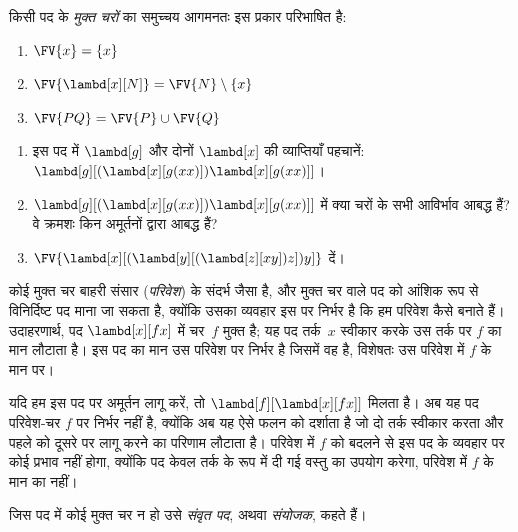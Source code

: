 \documentclass[../../../include/open-logic-section]{subfiles}
\begin{document}
\begin{defn}[किसी पद के मुक्त चर] 
  किसी पद के \emph{मुक्त चरों} का समुच्चय आगमनतः इस प्रकार परिभाषित है:
  \begin{enumerate}
    \item $\FV{x} = \{x\}$  
    \item $\FV{\lambd[x][N]} = \FV{N} \setminus \{x\}$    
    \item $\FV{PQ} = \FV{P} \cup \FV{Q}$ 
  \end{enumerate}
\end{defn}

\begin{prob}
  \begin{enumerate}
  \item इस पद में $\lambd[g]$ और दोनों $\lambd[x]$ की व्याप्तियाँ पहचानें:
    $\lambd[g][(\lambd[x][g (x x)]) \lambd[x][g (x x)]]$।
  \item $\lambd[g][(\lambd[x][g (x x)]) \lambd[x][g (x x)]]$ में क्या
    चरों के सभी आविर्भाव आबद्ध हैं? वे क्रमशः किन अमूर्तनों द्वारा आबद्ध हैं?
    \item $\FV{\lambd[x][(\lambd[y][(\lambd[z][x y]) z]) y]}$ दें।
  \end{enumerate}
\end{prob}

\begin{explain}
कोई मुक्त चर बाहरी संसार (\emph{परिवेश}) के संदर्भ जैसा है, और मुक्त चर
वाले पद को आंशिक रूप से विनिर्दिष्ट पद माना जा सकता है, क्योंकि उसका
व्यवहार इस पर निर्भर है कि हम परिवेश कैसे बनाते हैं। उदाहरणार्थ, पद
$\lambd[x][f x]$ में चर~$f$ मुक्त है; यह पद तर्क~$x$ स्वीकार करके उस तर्क
पर $f$ का मान लौटाता है। इस पद का मान उस परिवेश पर निर्भर है जिसमें वह है,
विशेषतः उस परिवेश में $f$ के मान पर।

यदि हम इस पद पर अमूर्तन लागू करें, तो $\lambd[f][\lambd[x][f x]]$ मिलता
है। अब यह पद परिवेश-चर $f$ पर निर्भर नहीं है, क्योंकि अब यह ऐसे फलन को
दर्शाता है जो दो तर्क स्वीकार करता और पहले को दूसरे पर लागू करने का परिणाम
लौटाता है। परिवेश में $f$ को बदलने से इस पद के व्यवहार पर कोई प्रभाव नहीं
होगा, क्योंकि पद केवल तर्क के रूप में दी गई वस्तु का उपयोग करेगा, परिवेश
में $f$ के मान का नहीं।
\end{explain}

\begin{defn}[संवृत पद, संयोजक]
  जिस पद में कोई मुक्त चर न हो उसे \emph{संवृत पद}, अथवा
  \emph{संयोजक}, कहते हैं।
\end{defn}
\end{document}
